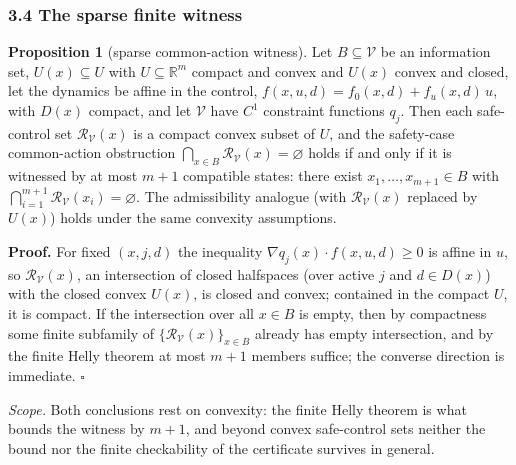 \documentclass[10pt,twocolumn]{article}
\theoremstyle{definition}
\newtheorem{proposition}{Proposition}
\begin{document}
\subsubsection{3.4 The sparse finite
witness}\label{the-sparse-finite-witness}

\begin{proposition}[sparse common-action witness]\label{prop:helly}
Let \(B\subseteq\mathcal V\) be an information set, \(U(x)\subseteq U\)
with \(U\subseteq\mathbb R^m\) compact and convex and \(U(x)\) convex and
closed, let the dynamics be affine in the control,
\(f(x,u,d)=f_0(x,d)+f_u(x,d)\,u\), with \(D(x)\) compact, and let
\(\mathcal V\) have \(C^1\) constraint functions \(q_j\). Then each
safe-control set \(\mathcal R_{\mathcal V}(x)\) is a compact convex
subset of \(U\), and the safety-case common-action obstruction
\(\bigcap_{x\in B}\mathcal R_{\mathcal V}(x)=\varnothing\) holds if and
only if it is witnessed by at most \(m+1\) compatible states: there
exist \(x_1,\dots,x_{m+1}\in B\) with
\(\bigcap_{i=1}^{m+1}\mathcal R_{\mathcal V}(x_i)=\varnothing\). The
admissibility analogue (with \(\mathcal R_{\mathcal V}(x)\) replaced by
\(U(x)\)) holds under the same convexity assumptions.
\end{proposition}

\textbf{Proof.} For fixed \((x,j,d)\) the inequality
\(\nabla q_j(x)\cdot f(x,u,d)\ge 0\) is affine in \(u\), so
\(\mathcal R_{\mathcal V}(x)\), an intersection of closed halfspaces
(over active \(j\) and \(d\in D(x)\)) with the closed convex \(U(x)\),
is closed and convex; contained in the compact \(U\), it is compact. If
the intersection over all \(x\in B\) is empty, then by compactness some
finite subfamily of \(\{\mathcal R_{\mathcal V}(x)\}_{x\in B}\) already
has empty intersection, and by the finite Helly theorem at most \(m+1\)
members suffice; the converse direction is immediate. \hfill\(\square\)

\emph{Scope.} Both conclusions rest on convexity: the finite Helly theorem is what bounds the witness by \(m+1\), and beyond convex safe-control sets neither the bound nor the finite checkability of the certificate survives in general.
\end{document}
